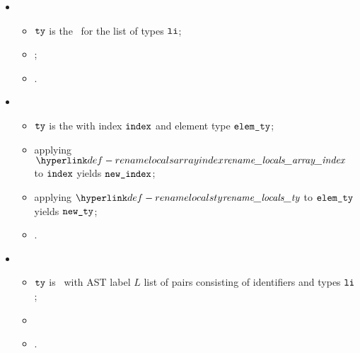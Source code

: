 \begin{itemize}
  \item {}
  \begin{itemize}
    \item $\tty$ is the \tupletypeterm\ for the list of types $\vli$;
    \item {};
    \item {}.
  \end{itemize}

  \item {}
  \begin{itemize}
    \item $\tty$ is the \arraytypeterm{} with index $\vindex$ and element type $\elemty$;
    \item applying $\renamelocalsarrayindex$ to $\vindex$ yields $\newindex$;
    \item applying $\renamelocalsty$ to $\elemty$ yields $\newty$;
    \item {}.
  \end{itemize}

  \item {}
  \begin{itemize}
    \item $\tty$ is \structuredtypeterm\ with AST label $L$ list of pairs consisting of identifiers and types $\vli$;
    \item {}
    \item {}.
  \end{itemize}
\end{itemize}

\FormallyParagraph
\begin{mathpar}
\end{mathpar}

